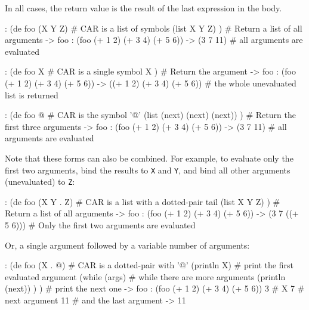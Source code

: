 In all cases, the return value is the result of the last expression in
the body.

\begin{wideverbatim}
: (de foo (X Y Z)                   # CAR is a list of symbols
   (list X Y Z) )                   # Return a list of all arguments
-> foo
: (foo (+ 1 2) (+ 3 4) (+ 5 6))
-> (3 7 11)                         # all arguments are evaluated
\end{wideverbatim}


\begin{wideverbatim}
: (de foo X                         # CAR is a single symbol
   X )                              # Return the argument
-> foo
: (foo (+ 1 2) (+ 3 4) (+ 5 6))
-> ((+ 1 2) (+ 3 4) (+ 5 6))        # the whole unevaluated list is returned
\end{wideverbatim}


\begin{wideverbatim}
: (de foo @                         # CAR is the symbol '@'
   (list (next) (next) (next)) )    # Return the first three arguments
-> foo
: (foo (+ 1 2) (+ 3 4) (+ 5 6))
-> (3 7 11)                         # all arguments are evaluated
\end{wideverbatim}

Note that these forms can also be combined. For example, to evaluate
only the first two arguments, bind the results to \texttt{X} and \texttt{Y}, and bind
all other arguments (unevaluated) to \texttt{Z}:


\begin{wideverbatim}
: (de foo (X Y . Z)                 # CAR is a list with a dotted-pair tail
   (list X Y Z) )                   # Return a list of all arguments
-> foo
: (foo (+ 1 2) (+ 3 4) (+ 5 6))
-> (3 7 ((+ 5 6)))                  # Only the first two arguments are evaluated
\end{wideverbatim}

Or, a single argument followed by a variable number of arguments:


\begin{wideverbatim}
: (de foo (X . @)                   # CAR is a dotted-pair with '@'
   (println X)                      # print the first evaluated argument
   (while (args)                    # while there are more arguments
      (println (next)) ) )          # print the next one
-> foo
: (foo (+ 1 2) (+ 3 4) (+ 5 6))
3                                   # X
7                                   # next argument
11                                  # and the last argument
-> 11
\end{wideverbatim}

